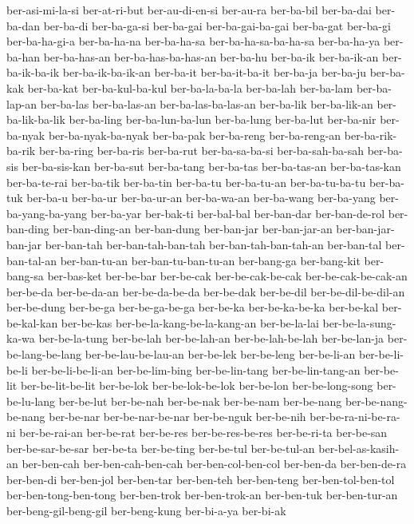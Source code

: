 {ber-asi-mi-la-si ber-at-ri-but ber-au-di-en-si ber-au-ra ber-ba-bil
ber-ba-dai ber-ba-dan ber-ba-di ber-ba-ga-si ber-ba-gai ber-ba-gai-ba-gai
ber-ba-gat ber-ba-gi ber-ba-ha-gi-a ber-ba-ha-na ber-ba-ha-sa
ber-ba-ha-sa-ba-ha-sa ber-ba-ha-ya ber-ba-han ber-ba-has-an
ber-ba-has-ba-has-an ber-ba-hu ber-ba-ik ber-ba-ik-an ber-ba-ik-ba-ik
ber-ba-ik-ba-ik-an ber-ba-it ber-ba-it-ba-it ber-ba-ja ber-ba-ju
ber-ba-kak ber-ba-kat ber-ba-kul-ba-kul ber-ba-la-ba-la ber-ba-lah
ber-ba-lam ber-ba-lap-an ber-ba-las ber-ba-las-an ber-ba-las-ba-las-an
ber-ba-lik ber-ba-lik-an ber-ba-lik-ba-lik ber-ba-ling ber-ba-lun-ba-lun
ber-ba-lung ber-ba-lut ber-ba-nir ber-ba-nyak ber-ba-nyak-ba-nyak
ber-ba-pak ber-ba-reng ber-ba-reng-an ber-ba-rik-ba-rik ber-ba-ring
ber-ba-ris ber-ba-rut ber-ba-sa-ba-si ber-ba-sah-ba-sah ber-ba-sis
ber-ba-sis-kan ber-ba-sut ber-ba-tang ber-ba-tas ber-ba-tas-an
ber-ba-tas-kan ber-ba-te-rai ber-ba-tik ber-ba-tin ber-ba-tu ber-ba-tu-an
ber-ba-tu-ba-tu ber-ba-tuk ber-ba-u ber-ba-ur ber-ba-ur-an ber-ba-wa-an
ber-ba-wang ber-ba-yang ber-ba-yang-ba-yang ber-ba-yar ber-bak-ti
ber-bal-bal ber-ban-dar ber-ban-de-rol ber-ban-ding ber-ban-ding-an
ber-ban-dung ber-ban-jar ber-ban-jar-an ber-ban-jar-ban-jar ber-ban-tah
ber-ban-tah-ban-tah ber-ban-tah-ban-tah-an ber-ban-tal ber-ban-tal-an
ber-ban-tu-an ber-ban-tu-ban-tu-an ber-bang-ga ber-bang-kit ber-bang-sa
ber-bas-ket ber-be-bar ber-be-cak ber-be-cak-be-cak ber-be-cak-be-cak-an
ber-be-da ber-be-da-an ber-be-da-be-da ber-be-dak ber-be-dil
ber-be-dil-be-dil-an ber-be-dung ber-be-ga ber-be-ga-be-ga ber-be-ka
ber-be-ka-be-ka ber-be-kal ber-be-kal-kan ber-be-kas
ber-be-la-kang-be-la-kang-an ber-be-la-lai ber-be-la-sung-ka-wa
ber-be-la-tung ber-be-lah ber-be-lah-an ber-be-lah-be-lah ber-be-lan-ja
ber-be-lang-be-lang ber-be-lau-be-lau-an ber-be-lek ber-be-leng
ber-be-li-an ber-be-li-be-li ber-be-li-be-li-an ber-be-lim-bing
ber-be-lin-tang ber-be-lin-tang-an ber-be-lit ber-be-lit-be-lit ber-be-lok
ber-be-lok-be-lok ber-be-lon ber-be-long-song ber-be-lu-lang ber-be-lut
ber-be-nah ber-be-nak ber-be-nam ber-be-nang ber-be-nang-be-nang
ber-be-nar ber-be-nar-be-nar ber-be-nguk ber-be-nih ber-be-ra-ni-be-ra-ni
ber-be-rai-an ber-be-rat ber-be-res ber-be-res-be-res ber-be-ri-ta
ber-be-san ber-be-sar-be-sar ber-be-ta ber-be-ting ber-be-tul
ber-be-tul-an ber-bel-as-kasih-an ber-ben-cah ber-ben-cah-ben-cah
ber-ben-col-ben-col ber-ben-da ber-ben-de-ra ber-ben-di ber-ben-jol
ber-ben-tar ber-ben-teh ber-ben-teng ber-ben-tol-ben-tol
ber-ben-tong-ben-tong ber-ben-trok ber-ben-trok-an ber-ben-tuk
ber-ben-tur-an ber-beng-gil-beng-gil ber-beng-kung ber-bi-a-ya ber-bi-ak
}
